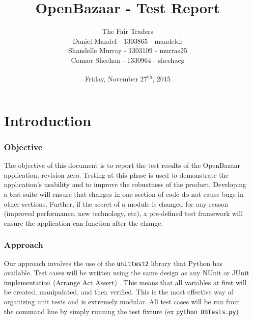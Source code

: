 \documentclass{article}
\begin{document}
\title{OpenBazaar - Test Report}
\author{The Fair Traders\\Daniel Mandel - 1303865 - mandeldr\\Shandelle Murray - 1303109 - murras25\\Connor Sheehan - 1330964 - sheehacg}
\date{Friday, November 27\textsuperscript{th}, 2015}
\maketitle


\newpage
\tableofcontents
\newpage

\part*{Introduction}
\section{Objective}
The objective of this document is to report the test results of the OpenBazaar application, revision zero. Testing at this phase is used to demonstrate the application's usability and to improve the robustness of the product. Developing a test suite will ensure that changes in one section of code do not cause bugs in other sections. Further, if the secret of a module is changed for any reason (improved performance, new technology, etc), a pre-defined test framework will ensure the application can function after the change.

\section{Approach}

Our approach involves the use of the \texttt{unittest2} library that Python has available. Test cases will be written using the same design as any NUnit or JUnit implementation (Arrange Act Assert) \cite{aaa}. This means that all variables at first will be created, manipulated, and then verified. This is the most effective way of organizing unit tests and is extremely modular. All test cases will be run from the command line by simply running the test fixture (ex \texttt{python OBTests.py})
\end{document}

